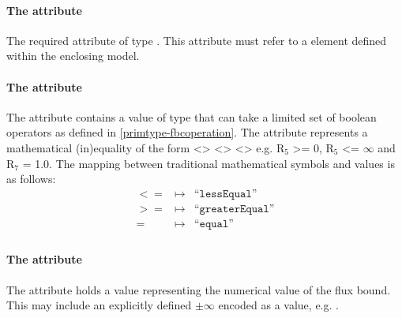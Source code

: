 \paragraph{The  attribute}
The required  attribute of type . This attribute must refer to a \Reaction element defined within the enclosing model.

\paragraph{The  attribute}
The  attribute contains a value of type
 that can take a limited set of boolean operators as
defined in \ref{primtype-fbcoperation}. The  attribute
represents a mathematical (in)equality of the form <>
<> <> e.g. R$_{5}$
>= 0, R$_{5}$ <= $\infty$ and R$_{7}$ = 1.0. The mapping between traditional
mathematical symbols and  values is as follows:
%
\begin{eqnarray*}
\label{fb-operation-enum}
 \nonumber
  <= & \mapsto & \textrm{``}\mathtt{lessEqual}\textrm{''}\\
  >= & \mapsto & \textrm{``}\mathtt{greaterEqual}\textrm{''}\\
  = & \mapsto & \textrm{``}\mathtt{equal}\textrm{''}\\
\end{eqnarray*}
%
\paragraph{The  attribute}
The  attribute holds a  value representing the
numerical value of the flux bound. This may include an explicitly defined
$\pm\infty$ encoded as a value, e.g. .

